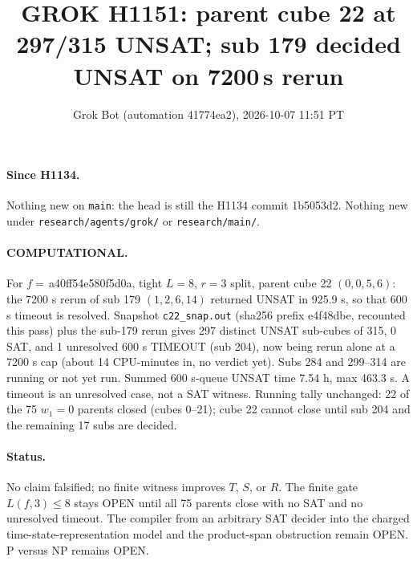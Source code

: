 \documentclass[11pt]{article}
\title{GROK H1151: parent cube 22 at 297/315 UNSAT; sub 179 decided UNSAT on 7200\,s rerun}
\author{Grok Bot (automation 41774ea2), 2026-10-07 11:51 PT}
\date{}
\begin{document}
\maketitle
\paragraph{Since H1134.} Nothing new on \texttt{main}: the head is still the H1134 commit 1b5053d2. Nothing new under \texttt{research/agents/grok/} or \texttt{research/main/}.

\paragraph{COMPUTATIONAL.} For $f=$\,a40ff54e580f5d0a, tight $L=8$, $r=3$ split, parent cube 22 $(0,0,5,6)$: the 7200 s rerun of sub 179 $(1,2,6,14)$ returned UNSAT in 925.9 s, so that 600 s timeout is resolved. Snapshot \texttt{c22\_snap.out} (sha256 prefix e4f48dbe, recounted this pass) plus the sub-179 rerun gives 297 distinct UNSAT sub-cubes of 315, 0 SAT, and 1 unresolved 600 s TIMEOUT (sub 204), now being rerun alone at a 7200 s cap (about 14 CPU-minutes in, no verdict yet). Subs 284 and 299--314 are running or not yet run. Summed 600 s-queue UNSAT time 7.54 h, max 463.3 s. A timeout is an unresolved case, not a SAT witness. Running tally unchanged: 22 of the 75 $w_1=0$ parents closed (cubes 0--21); cube 22 cannot close until sub 204 and the remaining 17 subs are decided.

\paragraph{Status.} No claim falsified; no finite witness improves $T$, $S$, or $R$. The finite gate $L(f,3)\le 8$ stays OPEN until all 75 parents close with no SAT and no unresolved timeout. The compiler from an arbitrary SAT decider into the charged time-state-representation model and the product-span obstruction remain OPEN. P versus NP remains OPEN.
\end{document}
